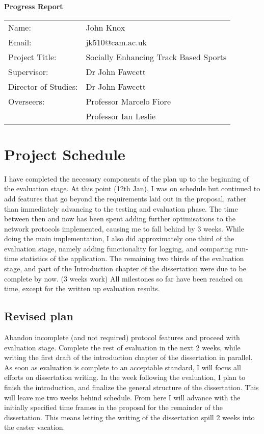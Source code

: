 \documentclass{article}
\begin{document}
\huge{\bf Progress Report}
\newline
{\large
\begin{tabular}{ll}
Name:                & John Knox                             \\
Email:               & jk510@cam.ac.uk                       \\
Project Title:       & Socially Enhancing Track Based Sports \\
Supervisor:          & Dr John Fawcett                           \\
Director of Studies: & Dr John Fawcett                           \\
Overseers:           & Professor Marcelo Fiore                   \\
                     & Professor Ian Leslie                      \\
\end{tabular}
}

\normalsize
\section*{Project Schedule}

I have completed the necessary components of the plan up to the beginning of the evaluation stage.
At this point (12th Jan), I was on schedule but continued to add features that go beyond the requirements laid out in the proposal, rather than immediately advancing to the testing and evaluation phase. The time between then and now has been spent adding further optimisations to the network protocols implemented, causing me to fall behind by 3 weeks.
While doing the main implementation, I also did approximately one third of the evaluation stage, namely adding functionality for logging, and comparing run-time statistics of the application. The remaining two thirds of the evaluation stage, and part of the Introduction chapter of the dissertation were due to be complete by now. (3 weeks work)
All milestones so far have been reached on time, except for the written up evaluation results.

\subsection*{Revised plan}
Abandon incomplete (and not required) protocol features and proceed with evaluation stage.
Complete the rest of evaluation in the next 2 weeks, while writing the first draft of the introduction chapter of the dissertation in parallel.
As soon as evaluation is complete to an acceptable standard, I will focus all efforts on dissertation writing.
In the week following the evaluation, I plan to finish the introduction, and finalize the general structure of the dissertation.
This will leave me two weeks behind schedule.
From here I will advance with the initially specified time frames in the proposal for the remainder of the dissertation. This means letting the writing of the dissertation spill 2 weeks into the easter vacation.
\end{document}
